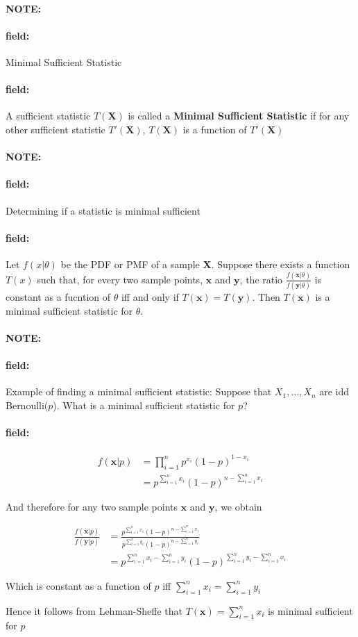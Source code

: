 \documentclass[12pt]{article}
\newenvironment{note}{\paragraph{NOTE:}}{}
\newenvironment{field}{\paragraph{field:}}{}
\begin{document}
\begin{note}
  \begin{field}
    Minimal Sufficient Statistic
  \end{field}
  \begin{field}
    A sufficient statistic $T(\mathbf{X})$ is called a \textbf{Minimal Sufficient Statistic} if for any other sufficient statistic $T'(\mathbf{X})$, $T(\mathbf{X})$ is a function of $T'(\mathbf{X})$
  \end{field}
\end{note}

\begin{note}
  \begin{field}
    Determining if a statistic is minimal sufficient
  \end{field}
  \begin{field}
    Let $f(x|\theta)$ be the PDF or PMF of a sample $\mathbf{X}$. Suppose there exists a function $T(x)$ such that, for every two sample points, $\mathbf{x}$ and $\mathbf{y}$, the ratio $\frac{f(\mathbf{x}|\theta)}{f(\mathbf{y}|\theta)}$ is constant as a fucntion of $\theta$ iff and only if $T(\mathbf{x}) = T(\mathbf{y})$. Then $T(\mathbf{x})$ is a minimal sufficient statistic for $\theta$.
  \end{field}
\end{note}


\begin{note}
  \begin{field}
    Example of finding a minimal sufficient statistic:
    Suppose that $X_1, \ldots , X_n$ are idd Bernoulli($p$). What is a minimal sufficient statistic for $p$?
  \end{field}
  \begin{field}
    \begin{align*}
      f(\mathbf{x}|p) &= \prod_{i = 1}^n p^{x_i}(1-p)^{1 - x_i}\\
      &= p^{\sum _{i = 1}^n x_i}(1-p)^{n - \sum _{i = 1}^nx_i}
    \end{align*}

    And therefore for any two sample points $\mathbf{x}$ and $\mathbf{y}$, we obtain

    \begin{align*}
      \frac{f(\mathbf{x}|p)}{f(\mathbf{y}|p)} &= \frac{p^{\sum _{i = 1}^n x_i}(1-p)^{n - \sum _{i = 1}^nx_i}}{p^{\sum _{i = 1}^n y_i}(1-p)^{n - \sum _{i = 1}^ny_i}}\\
      &= p^{\sum _{i = 1}^n x_i - \sum _{i = 1}^n y_i}(1-p)^{\sum _{i = 1}^n y_i - \sum _{i = 1}^nx_i}
    \end{align*}

    Which is constant as a function of $p$ iff $\sum _{i = 1}^n x_i = \sum _{i = 1}^n y_i$

    Hence it follows from Lehman-Sheffe that $T(\mathbf{x}) = \sum _{i = 1}^n x_i$ is minimal sufficient for $p$
  \end{field}
\end{note}
\end{document}
